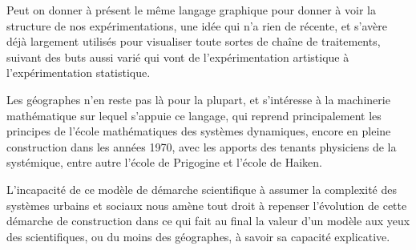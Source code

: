 Peut on donner à présent le même langage graphique pour donner à voir la structure de nos expérimentations, une idée qui n'a rien de récente, et s'avère déjà largement utilisés pour visualiser toute sortes de chaîne de traitements, suivant des buts aussi varié qui vont de l'expérimentation artistique à l'expérimentation statistique.

Les géographes n'en reste pas là pour la plupart, et s'intéresse à la machinerie mathématique sur lequel s'appuie ce langage, qui reprend principalement les principes de l'école mathématiques des systèmes dynamiques, encore en pleine construction dans les années 1970, avec les apports des tenants physiciens de la systémique, entre autre l'école de Prigogine et l'école de Haiken.


L'incapacité de ce modèle de démarche scientifique à assumer la complexité des systèmes urbains et sociaux nous amène tout droit à repenser l'évolution de cette démarche de construction dans ce qui fait au final la valeur d'un modèle aux yeux des scientifiques, ou du moins des géographes, à savoir sa capacité explicative.

